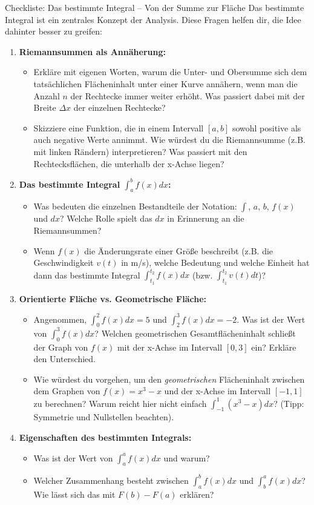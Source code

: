 \begin{aufgabenumgebung}{Checkliste: Das bestimmte Integral – Von der Summe zur Fläche}
Das bestimmte Integral ist ein zentrales Konzept der Analysis. Diese Fragen helfen dir, die Idee dahinter besser zu greifen:

\begin{enumerate}[label=(\alph*)]
    \item \textbf{Riemannsummen als Annäherung:}
    \begin{itemize}
        \item Erkläre mit eigenen Worten, warum die Unter- und Obersumme sich dem tatsächlichen Flächeninhalt unter einer Kurve annähern, wenn man die Anzahl $n$ der Rechtecke immer weiter erhöht. Was passiert dabei mit der Breite $\Delta x$ der einzelnen Rechtecke?
        \item Skizziere eine Funktion, die in einem Intervall $[a,b]$ sowohl positive als auch negative Werte annimmt. Wie würdest du die Riemannsumme (z.B. mit linken Rändern) interpretieren? Was passiert mit den Rechtecksflächen, die unterhalb der x-Achse liegen?
    \end{itemize}
    \item \textbf{Das bestimmte Integral $\int_a^b f(x)dx$:}
    \begin{itemize}
        \item Was bedeuten die einzelnen Bestandteile der Notation: $\int$, $a$, $b$, $f(x)$ und $dx$? Welche Rolle spielt das $dx$ in Erinnerung an die Riemannsummen?
        \item Wenn $f(x)$ die Änderungsrate einer Größe beschreibt (z.B. die Geschwindigkeit $v(t)$ in m/s), welche Bedeutung und welche Einheit hat dann das bestimmte Integral $\int_{t_1}^{t_2} f(x)dx$ (bzw. $\int_{t_1}^{t_2} v(t)dt$)?
    \end{itemize}
    \item \textbf{Orientierte Fläche vs. Geometrische Fläche:}
    \begin{itemize}
        \item Angenommen, $\int_0^2 f(x)dx = 5$ und $\int_2^3 f(x)dx = -2$. Was ist der Wert von $\int_0^3 f(x)dx$? Welchen geometrischen Gesamtflächeninhalt schließt der Graph von $f(x)$ mit der x-Achse im Intervall $[0,3]$ ein? Erkläre den Unterschied.
        \item Wie würdest du vorgehen, um den \textit{geometrischen} Flächeninhalt zwischen dem Graphen von $f(x)=x^3-x$ und der x-Achse im Intervall $[-1,1]$ zu berechnen? Warum reicht hier nicht einfach $\int_{-1}^1 (x^3-x)dx$? (Tipp: Symmetrie und Nullstellen beachten).
    \end{itemize}
    \item \textbf{Eigenschaften des bestimmten Integrals:}
    \begin{itemize}
        \item Was ist der Wert von $\int_a^a f(x)dx$ und warum?
        \item Welcher Zusammenhang besteht zwischen $\int_a^b f(x)dx$ und $\int_b^a f(x)dx$? Wie lässt sich das mit $F(b)-F(a)$ erklären?
    \end{itemize}
\end{enumerate}
\end{aufgabenumgebung}

